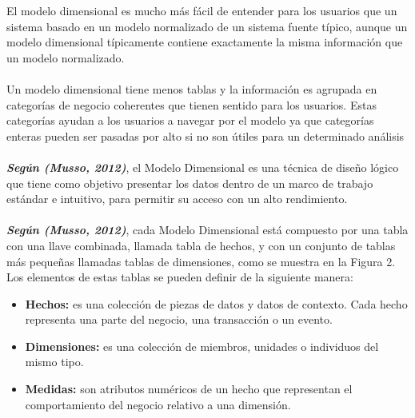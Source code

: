 \documentclass[11pt,a4paper]{article}
\begin{document}
		El modelo dimensional es mucho más fácil de entender para los usuarios que un sistema basado en un modelo normalizado de un sistema fuente típico, aunque un modelo dimensional típicamente contiene exactamente la misma información que un modelo normalizado.\\
		\\
		Un modelo dimensional tiene menos tablas y la información es agrupada en categorías de negocio coherentes que tienen sentido para los usuarios. Estas categorías ayudan a los usuarios a navegar por el modelo ya que categorías enteras pueden ser pasadas por alto si no son útiles para un determinado análisis\\
		\\
		\textit{\textbf{Según (Musso, 2012)}}, el Modelo Dimensional es una técnica de diseño lógico que tiene como objetivo presentar los datos dentro de un marco de trabajo estándar e intuitivo, para permitir su acceso con un alto rendimiento.\\
		\\
		\textit{\textbf{Según (Musso, 2012)}}, cada Modelo Dimensional está compuesto por una tabla con una llave combinada, llamada tabla de hechos, y con un conjunto de tablas más pequeñas llamadas tablas de dimensiones, como se muestra en la Figura 2. Los elementos de estas tablas se pueden definir de la siguiente manera:		
			\begin{itemize}
				\item \textbf{ Hechos:} es una colección de piezas de datos y datos de contexto. Cada hecho representa una parte del negocio, una transacción o un evento.
				\item \textbf{Dimensiones:} es una colección de miembros, unidades o individuos del mismo tipo.
				\item \textbf{Medidas:} son atributos numéricos de un hecho que representan el comportamiento del negocio relativo a una dimensión.
			\end{itemize}
		
\end{document}
